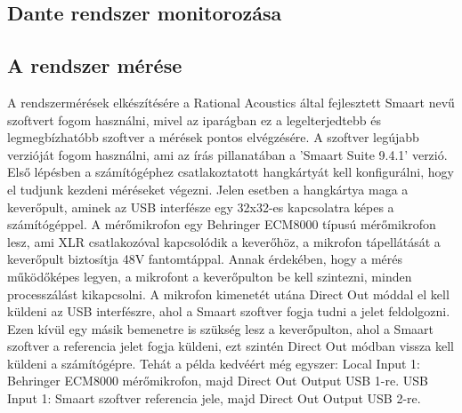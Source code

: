 \subsection{Dante rendszer monitorozása}









\subsection{A rendszer mérése}
A rendszermérések elkészítésére a Rational Acoustics által fejlesztett Smaart nevű szoftvert fogom használni, mivel
az iparágban ez a legelterjedtebb és legmegbízhatóbb szoftver a mérések pontos elvégzésére.
A szoftver legújabb verzióját fogom használni, ami az írás pillanatában a 'Smaart Suite 9.4.1' verzió.
Első lépésben a számítógéphez csatlakoztatott hangkártyát kell konfigurálni, hogy el tudjunk kezdeni méréseket végezni.
Jelen esetben a hangkártya maga a keverőpult, aminek az USB interfésze egy 32x32-es kapcsolatra képes a számítógéppel.
A mérőmikrofon egy Behringer ECM8000 típusú mérőmikrofon lesz, ami XLR csatlakozóval kapcsolódik a keverőhöz, a mikrofon tápellátását
a keverőpult biztosítja 48V fantomtáppal. Annak érdekében, hogy a mérés működőképes legyen, a mikrofont a keverőpulton be kell szintezni, minden 
processzálást kikapcsolni. A mikrofon kimenetét utána Direct Out móddal el kell küldeni az USB interfészre, ahol a Smaart szoftver
fogja tudni a jelet feldolgozni. Ezen kívül egy másik bemenetre is szükség lesz a keverőpulton, ahol a Smaart szoftver a referencia jelet fogja
küldeni, ezt szintén Direct Out módban vissza kell küldeni a számítógépre.
Tehát a példa kedvéért még egyszer:
Local Input 1: Behringer ECM8000 mérőmikrofon, majd Direct Out Output USB 1-re.
USB Input 1: Smaart szoftver referencia jele, majd Direct Out Output USB 2-re.


